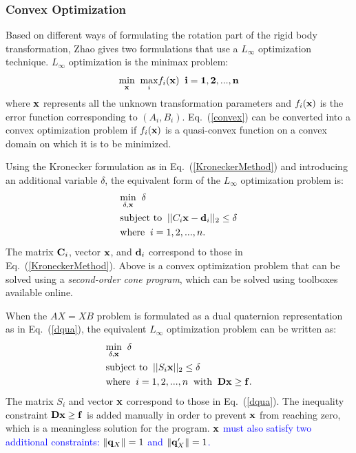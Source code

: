 \documentclass[twocolumn,10pt]{asme2ej}
\newcommand{\qq}{{\bf q}}
\newcommand{\xx}{{\bf x}}
\begin{document}
\subsubsection{Convex Optimization}
Based on different ways of formulating the rotation part of the rigid body transformation, Zhao \cite{zhao2011hand} gives two formulations that use a $L_\infty$ optimization technique. $L_\infty$ optimization is the minimax problem:
\begin{equation}
\underset{\bf x}{\text{min}} \; \; \underset{i}{\text{max}} f_{i}(\bf x) \; \; i = 1,2,... ,n
\label{convex}
\end{equation} 
where $\bf x$ represents all the unknown transformation parameters and $f_{i}(\xx)$ is the error function corresponding to $(A_i, B_i)$. Eq.~(\ref{convex}) can be converted into a convex optimization problem if $f_i(\bf x)$ is a quasi-convex function on a convex domain on which it is to be minimized.  

Using the Kronecker formulation as in Eq.~(\ref{KroneckerMethod}) and introducing an additional variable $\delta$, the equivalent form of the $L_\infty$ optimization problem is:
\begin{equation}
\begin{split}
&\underset{\delta, \xx}{\text{min}} \; \; \delta \\
&\text{subject to} \; \; ||C_i\xx - {\bf d}_i||_2 \leq \delta \\
&\text{where} \; \; i = 1,2,...,n.
\end{split}
\end{equation}
The matrix ${\bf C}_i$, vector $\bf x$, and ${\bf d}_i$ correspond to those in Eq.~(\ref{KroneckerMethod}).
Above is a convex optimization problem that can be solved using a \textit{second-order cone program}, which can be solved using toolboxes available online. 

When the $AX=XB$ problem is formulated as a dual quaternion representation as in Eq.~(\ref{dqua}), the equivalent $L_\infty$ optimization problem can be written as:
\begin{equation}
\begin{split}
&\underset{\delta, \xx}{\text{min}} \; \; \delta \\
&\text{subject to} \; \; ||S_i\xx||_2 \leq \delta \\
&\text{where} \; \; i = 1,2,...,n \; \; \text{with} \; \; \bf{Dx \geq f}.
\end{split}
\end{equation}
The matrix $S_i$ and vector $\bf x$ correspond to those in Eq.~(\ref{dqua}). 
The inequality constraint $\bf{Dx \geq f}$ is added manually in order to prevent $\xx$ from reaching zero, which is a meaningless solution for the program. \textcolor{blue}{$\bf x$ must also satisfy two additional constraints: $\|\qq_X\|=1$ and $\|\qq_{X}^{\prime}\|=1$.}%
\end{document}
